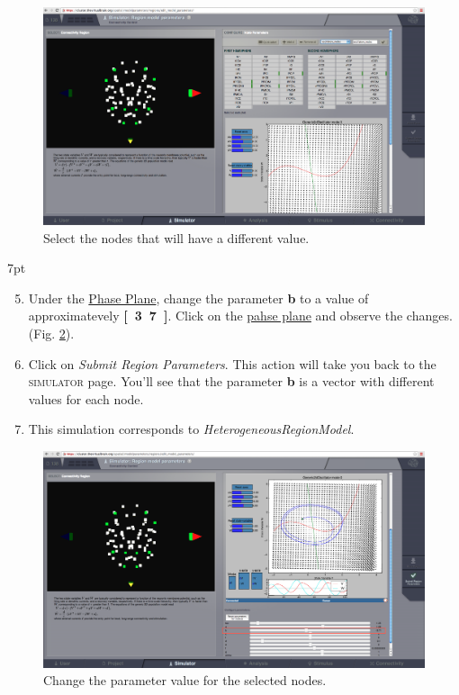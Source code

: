 \documentclass{tufte-handout}
\newenvironment{simulation}{%
  \def\FrameCommand{%
    \hspace{1pt}%
    {\color{ForestGreen}\vrule width 2pt}%
    {\color{simulationshade}\vrule width 4pt}%
    \colorbox{simulationshade}%
  }%
  \MakeFramed{\advance\hsize-\width\FrameRestore}%
  \noindent\hspace{-4.55pt}%
  \begin{adjustwidth}{}{7pt}%
  \vspace{2pt}\vspace{2pt}%
}
{%
  \vspace{2pt}\end{adjustwidth}\endMakeFramed%
}
\begin{document}
\begin{figure}[h]
  \includegraphics[width=\linewidth]{Handout_UI_HeterogenousModelAndStimulation_SpatializationSelectNodes.png}%
  \caption{Select the nodes that will have a different value.}%
  \label{fig:oscillatory_nodes}%
\end{figure}

\begin{simulation}
\begin{enumerate}
\setcounter{enumi}{4}
\item Under the \underline{Phase Plane}, change the parameter \textbf{b} to a value of approximatevely \textbf{\unit[3.7]}. Click on the \underline{pahse plane} and observe the changes. (Fig. \ref{fig:oscillatory_nodes_trajectory}).
\item Click on \textit{Submit Region Parameters}. This action will take you back to the \textsc{simulator} page. You'll see that the parameter \textbf{b} is a vector with different values for each node. 
\item This simulation corresponds to  \textit{HeterogeneousRegionModel}.
\end{enumerate}
\end{simulation}

\begin{figure}[h]
  \includegraphics[width=\linewidth]{Handout_UI_HeterogenousModelAndStimulation_SpatializationChangeParameter.png}%
  \caption{Change the parameter value for the selected nodes.}%
  \label{fig:oscillatory_nodes_trajectory}%
\end{figure}
\end{document}
